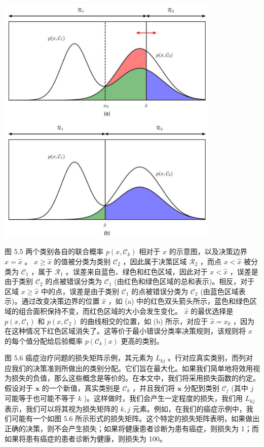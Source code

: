\documentclass[10pt]{article}
\begin{document}
\begin{center}
\includegraphics[max width=0.8\textwidth]{images/0194e279-9b28-703a-88f4-c3ac21e2010d_160_342_347_1110_1268_0.jpg}
\end{center}
\hspace*{3em} 

图 5.5 两个类别各自的联合概率 \(p\left( {x,{\mathcal{C}}_{k}}\right)\) 相对于 \(x\) 的示意图，以及决策边界 \(x = \widehat{x}\) 。 \(x \geq  \widehat{x}\) 的值被分类为类别 \({\mathcal{C}}_{2}\) ，因此属于决策区域 \({\mathcal{R}}_{2}\) ，而点 \(x < \widehat{x}\) 被分类为 \({\mathcal{C}}_{1}\) ，属于 \({\mathcal{R}}_{1}\) 。误差来自蓝色、绿色和红色区域，因此对于 \(x < \widehat{x}\) ，误差是由于类别 \({\mathcal{C}}_{2}\) 的点被错误分类为 \({\mathcal{C}}_{1}\) (由红色和绿色区域的总和表示)。相反，对于区域 \(x \geq  \widehat{x}\) 中的点，误差是由于类别 \({\mathcal{C}}_{1}\) 的点被错误分类为 \({\mathcal{C}}_{2}\) (由蓝色区域表示)。通过改变决策边界的位置 \(\widehat{x}\) ，如 (a) 中的红色双头箭头所示，蓝色和绿色区域的组合面积保持不变，而红色区域的大小会发生变化。 \(\widehat{x}\) 的最优选择是 \(p\left( {x,{\mathcal{C}}_{1}}\right)\) 和 \(p\left( {x,{\mathcal{C}}_{2}}\right)\) 的曲线相交的位置，如 (b) 所示，对应于 \(\widehat{x} = {x}_{0}\) ，因为在这种情况下红色区域消失了。这等价于最小错误分类率决策规则，该规则将 \(x\) 的每个值分配给后验概率 \(p\left( {{\mathcal{C}}_{k} \mid  x}\right)\) 更高的类别。

图 5.6 癌症治疗问题的损失矩阵示例，其元素为 \({L}_{kj}\) 。行对应真实类别，而列对应我们的决策准则所做出的类别分配。它们旨在最大化。如果我们简单地将效用视为损失的负值，那么这些概念是等价的。在本文中，我们将采用损失函数的约定。假设对于 \(\mathbf{x}\) 的一个新值，真实类别是 \({\mathcal{C}}_{k}\) ，并且我们将 \(\mathbf{x}\) 分配到类别 \({\mathcal{C}}_{j}\) (其中 \(j\) 可能等于也可能不等于 \(k\) )。这样做时，我们会产生一定程度的损失，我们用 \({L}_{kj}\) 表示，我们可以将其视为损失矩阵的 \(k,j\) 元素。例如，在我们的癌症示例中，我们可能有一个如图 5.6 所示形式的损失矩阵。这个特定的损失矩阵表明，如果做出正确的决策，则不会产生损失；如果将健康患者诊断为患有癌症，则损失为 1；而如果将患有癌症的患者诊断为健康，则损失为 100。
\end{document}
